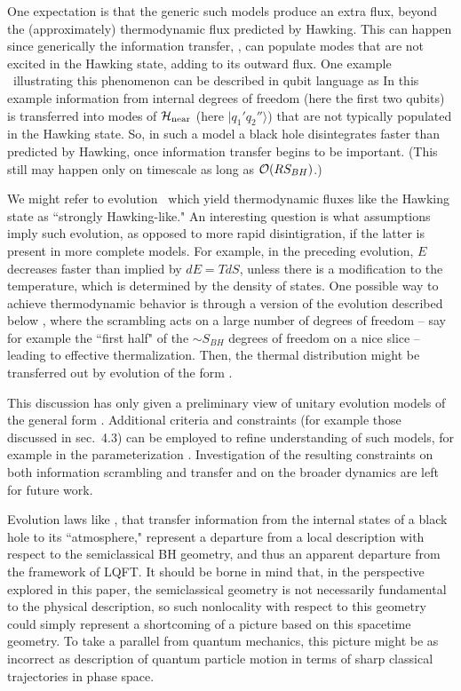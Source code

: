 One expectation is that the generic such models produce an extra flux, beyond the (approximately) thermodynamic flux predicted by Hawking.  This can happen since generically the information transfer, \hawkmodt,  can populate modes that are not excited in the Hawking state, adding to its outward flux.  One example \ModelsU\ illustrating this phenomenon can be described in qubit language as 
%
\eqn{}
%
In this example information from internal degrees of freedom (here  the first two qubits) is transferred into modes of ${{\cal H}_{\rm near}}$ (here $|q_1'q_2''\rangle$) that are not typically populated in the Hawking state.  So, in such a model a black hole disintegrates faster than predicted by Hawking, once information transfer begins to be important.  (This still may happen only on timescale as long as ${\cal O}(RS_{BH})$.)

We might refer to evolution \hbhcomb\ which yield thermodynamic fluxes like the Hawking state as ``strongly Hawking-like."  An interesting question is what assumptions imply such evolution, as opposed to more rapid disintigration, if  the latter is present in more complete models. For example, in the preceding evolution, $E$ decreases faster than implied by $dE=T dS$, unless there is a modification to the temperature, which is determined by the density of states. One possible way to achieve thermodynamic behavior is through a version of  the evolution described below \evoltwo, where the scrambling acts on a large number of degrees of freedom -- say for example the ``first half" of the $\sim S_{BH}$ degrees of freedom on a nice slice -- leading to effective thermalization.  Then, the thermal distribution might be transferred out by evolution of the form \evoltwo.


This discussion has only given a preliminary view of unitary evolution models of the general form \hbhcomb.  Additional criteria and constraints (for example those discussed in sec.~4.3) can be employed to refine understanding of such models, for example in the parameterization \hawkmodt.    Investigation of the resulting constraints on both information scrambling and transfer and on the broader dynamics are left for future work.



Evolution laws like \hbhcomb, that transfer information from the internal states of a black hole to its ``atmosphere," represent a departure from a local description with respect to the semiclassical BH geometry, and thus an apparent departure from the framework of LQFT.  It should be borne in mind that, in the perspective explored in this paper, the semiclassical  geometry is not necessarily fundamental to the physical description, so such nonlocality with respect to this geometry could simply represent a shortcoming of a picture based on this spacetime geometry.  To take a parallel from quantum mechanics, this picture might be as incorrect as description of quantum particle motion in terms of sharp classical trajectories in phase space.

